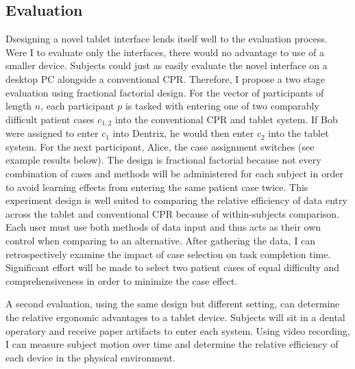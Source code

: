 \documentclass[11pt]{article}
\begin{document}
\subsection{Evaluation}
\label{eval}


Dsesigning a novel tablet interface lends itself well to the evaluation process. Were I to evaluate only the interfaces, there would no advantage to use of a smaller device. Subjects could just as easily evaluate the novel interface on a desktop PC alongside a conventional CPR. Therefore, I propose a two stage evaluation using fractional factorial design. For the vector of participants of length $n$, each participant $p$ is tasked with entering one of two comparably difficult patient cases $c_{1,2}$ into the conventional CPR and tablet system. If Bob were assigned to enter $c_1$ into Dentrix, he would then enter $c_2$ into the tablet system. For the next participant, Alice, the case assignment switches (see example results below). The design is fractional factorial because not every combination of cases and methods will be administered for each subject in order to avoid learning effects from entering the same patient case twice. This experiment design is well suited to comparing the relative efficiency of data entry across the tablet and conventional CPR because of within-subjects comparison. Each user must use both methods of data input and thus acts as their own control when comparing to an alternative. After gathering the data, I can retrospectively examine the impact of case selection on task completion time. Significant effort will be made to select two patient cases of equal difficulty and comprehensiveness in order to minimize the case effect.

A second evaluation, using the same design but different setting, can determine the relative ergonomic advantages to a tablet device. Subjects will sit in a dental operatory and receive paper artifacts to enter each system. Using video recording, I can measure subject motion over time and determine the relative efficiency of each device in the physical environment.
\end{document}

